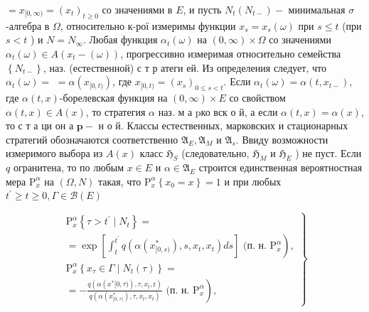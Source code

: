 \documentclass[10pt]{article}
\begin{document}
$=x_{[0, \infty)}=\left(x_{t}\right)_{t \geqslant 0}$ со значениями в $E$, и пусть $N_{t}\left(N_{t-}\right)-$ минимальная $\sigma$-алгебра в $\Omega$, относительно к-рої измеримы функции $x_{s}=x_{s}(\omega)$ при $s \leqslant t$ (при $s<t$ ) и $N=N_{\infty}$. Любая функция $\alpha_{t}(\omega)$ на $(0, \infty) \times \Omega$ со значениями $\alpha_{t}(\omega) \in A\left(x_{t}-(\omega)\right)$, прогрессивно измеримая относительно семейства $\left\{N_{t-}\right\}$, наз. (естественной) с т р атеги ей. Из определения следует, что $\alpha_{t}(\omega)=$ $=\alpha\left(x_{[0, t)}\right)$, где $x_{[0, t)}=\left(x_{s}\right)_{0 \leqslant s<t}$. Если $\alpha_{t}(\omega)=\alpha\left(t, x_{t-}\right)$, где $\alpha(t, x)$-борелевская функция на $(0, \infty) \times E$ со свойством $\alpha(t, x) \in A(x)$, то стратегия $\alpha$ наз. м а pко вск о й, а если $\alpha(t, x)=\alpha(x)$, то с т а ци он а $\mathbf{p}-$ н о й. Классы естественных, марковских и стационарных стратегий обозначаются соответственно $\mathfrak{A}_{E}, \mathfrak{A}_{M}$ и $\mathfrak{A}_{s}$. Ввиду возможности измеримого выбора из $A(x)$ класс $\mathfrak{H}_{S}$ (следовательно, $\mathfrak{H}_{M}$ и $\mathfrak{H}_{E}$ ) не пуст. Если $q$ огранитена, то по любым $x \in E$ и $\alpha \in \mathfrak{A}_{E}$ строится единственная вероятностная мера $\mathrm{P}_{x}^{\alpha}$ на $(\Omega, N)$ такая, что $\mathrm{P}_{x}^{\alpha}\left\{x_{0}=x\right\}=1$ и при любых $t^{\prime} \geqslant t \geqslant 0, \Gamma \in \mathscr{B}(E)$



\[

\left.\begin{array}{c}

\mathrm{P}_{x}^{\alpha}\left\{\tau>t^{\prime} \mid N_{t}\right\}= \\

\left.=\exp \left[\int_{t}^{t^{\prime}} q\left(\alpha\left(x_{[0, s)}^{*}\right), s, x_{t}, x_{t}\right) d s\right] \text { (п. н. } \mathrm{P}_{x}^{\alpha}\right), \\

\mathrm{P}_{x}^{\alpha}\left\{x_{\tau} \in \Gamma \mid N_{t}(\tau)\right\}= \\

\left.=-\frac{q\left(\alpha\left(x^{*}[0, \tau)\right), \tau, x_{t}, \mathrm{r}\right)}{q\left(\alpha\left(x_{[0, \tau)}^{*}\right), \tau, x_{t}, x_{t}\right)} \text { (п. н. } \mathrm{P}_{x}^{\alpha}\right),

\end{array}\right\}

\]
\end{document}
